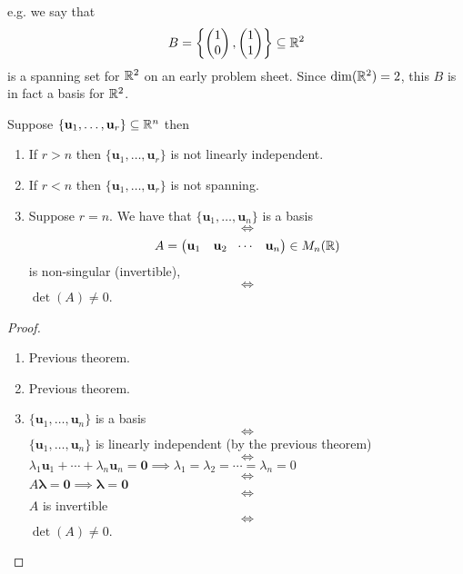 \documentclass[10pt, a4paper]{article}
\newcommand{\mbf}[1]{\mathbf{#1}}
\begin{document}
e.g. we say that
\[
B = \left\{\begin{pmatrix}
    1 \\ 0
\end{pmatrix},
\begin{pmatrix}
    1 \\ 1
\end{pmatrix}\right\} \subseteq \mathbb{R} ^ 2
\]
is a spanning set for $\mathbb{R} ^ 2$ on an early problem sheet.
Since $\dim(\mathbb{R} ^ 2) = 2$,
this $B$ is in fact a basis for $\mathbb{R} ^ 2$.

\begin{theorem}
    Suppose $\{\mbf{u}_1, \dotsc, \mbf{u}_r\} \subseteq \R ^ n$ then
    \begin{enumerate}[label = (\roman*)]
        \item If $r > n$ then $\{\mbf{u}_1, \dotsc, \mbf{u}_r\}$ is not linearly independent.
        \item If $r < n$ then $\{\mbf{u}_1, \dotsc, \mbf{u}_r\}$ is not spanning.
        \item Suppose $r = n$.
        We have that $\{\mbf{u}_1, \dotsc, \mbf{u}_n\}$ is a basis
        \[
        \iff
        \]
        \[
        A = \begin{pmatrix}
            \mbf{u}_1 & \mbf{u}_2 & \dotsi & \mbf{u}_n
        \end{pmatrix} \in M_n(\R)
        \]
        is non-singular
        (invertible),
        \[
        \iff
        \]
        $\det(A) \neq 0$.
    \end{enumerate}
    \begin{proof}\phantom{}
        \begin{enumerate}[label = (\roman*)]
            \item Previous theorem.
            \item Previous theorem.
            \item
            \centering
            $\{\mbf{u}_1, \dotsc, \mbf{u}_n\}$ is a basis
            \[
            \iff
            \]
            $\{\mbf{u}_1, \dotsc, \mbf{u}_n\}$ is linearly independent
            (by the previous theorem)
            \[
            \iff
            \]
            $\lambda_1\mbf{u}_1 + \dotsi + \lambda_n\mbf{u}_n = \mbf{0} \implies \lambda_1 = \lambda_2 = \dotsi = \lambda_n = 0$
            \[
            \iff
            \]
            $A\pmb{\lambda} = \mbf{0} \implies \pmb{\lambda} = \mbf{0}$
            \[
            \iff
            \]
            $A$ is invertible
            \[
            \iff
            \]
            $\det(A) \neq 0$.
        \end{enumerate}
    \end{proof}
\end{theorem}
\end{document}
